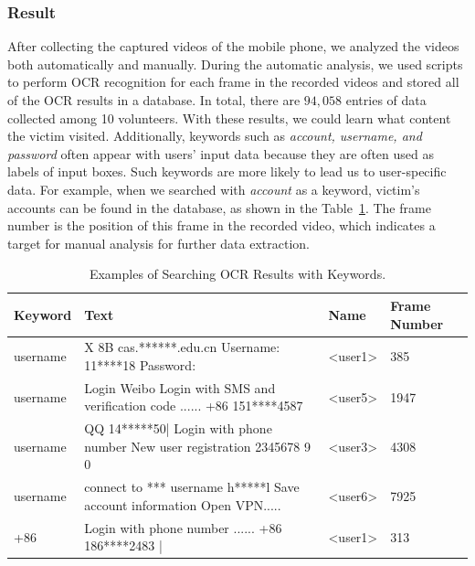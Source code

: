 \subsubsection{Result}

After collecting the captured videos of the mobile phone, we analyzed the videos both automatically and manually.
During the automatic analysis, we used scripts to perform OCR recognition for each frame in the recorded videos and stored all of the OCR results in a database.
In total, there are $94,058$ entries of data collected among 10 volunteers.
With these results, we could learn what content the victim visited.
Additionally, keywords such as \textit{account, username, and password} often appear with users' input data because they are often used as labels of input boxes.
Such keywords are more likely to lead us to user-specific data.
For example, when we searched with \textit{account} as a keyword, victim's accounts can be found in the database, as shown in the Table~\ref{tab:ocr_keyword_example}.
The frame number is the position of this frame in the recorded video, which indicates a target for manual analysis for further data extraction.

\begin{table}[t]
	\centering
	\begin{tabular}{|l|l|l|l|}
		\hline
		\textbf{Keyword}  & \textbf{Text}                                                                                                                          & \textbf{Name}                           & \textbf{Frame Number} \\ \hline
		username & X 8B cas.******.edu.cn Username: 11****18 Password:                                                                           & \textless{}user1\textgreater{} & 385          \\ \hline
		username & Login Weibo Login with SMS and verification code ...... +86 151****4587 & \textless{}user5\textgreater{} & 1947         \\ \hline
		username & QQ 14*****50| Login with phone number New user registration 2345678 9 0                                                       & \textless{}user3\textgreater{} & 4308         \\ \hline
		username & connect to *** username h*****l Save account information Open VPN.....                                                        & \textless{}user6\textgreater{} & 7925         \\ \hline
		+86      & Login with phone number ...... +86 186****2483 |                                                                              & \textless{}user1\textgreater{} & 313          \\ \hline
	\end{tabular}
	\linebreak
	\caption{Examples of Searching OCR Results with Keywords.}
	\label{tab:ocr_keyword_example}
\end{table}


